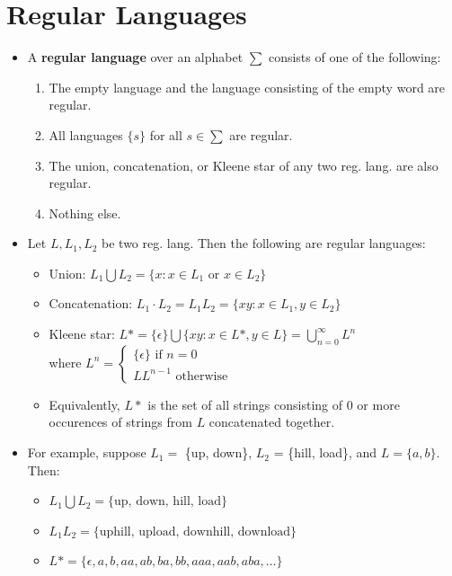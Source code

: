 \documentclass[12pt]{article}
\begin{document}
\section{Regular Languages}
\begin{itemize}
    \item A \textbf{regular language} over an alphabet $\sum$ consists of one of the following:
        \begin{enumerate}
            \item The empty language and the language consisting of the empty word are regular.
            \item All languages $\{s\}$ for all $s \in \sum$ are regular.
            \item The union, concatenation, or Kleene star of any two reg. lang. are also regular.
            \item Nothing else.
        \end{enumerate}
    \item Let $L, L_1, L_2$ be two reg. lang.  Then the following are regular languages:
        \begin{itemize}
            \item Union: $L_1 \bigcup L_2 = \{x : x \in L_1 \text{ or } x \in L_2\}$
            \item Concatenation: $L_1 \cdot L_2 = L_1L_2 = \{xy : x \in L_1, y \in L_2\}$
            \item Kleene star: $L* = \{\epsilon\} \bigcup \{xy : x \in L*, y \in L\} = \bigcup_{n=0}^{\infty} L^n$\\where $L^n = \begin{cases} \{\epsilon\} \text{ if } n = 0\\ LL^{n-1} \text{ otherwise}\end{cases}$
                \item Equivalently, $L*$ is the set of all strings consisting of 0 or more occurences of strings from $L$ concatenated together.
        \end{itemize}
    \item For example, suppose $L_1 =$ \{up, down\}, $L_2$ = \{hill, load\}, and $L = \{a, b\}$.  Then:
        \begin{itemize}
            \item $L_1 \bigcup L_2 = \{\text{up, down, hill, load}\}$
            \item $L_1L_2 = \{\text{uphill, upload, downhill, download}\}$
            \item $L* = \{\epsilon, a, b, aa, ab, ba, bb, aaa, aab, aba, \dots\}$

\end{itemize}
\end{itemize}
\end{document}
